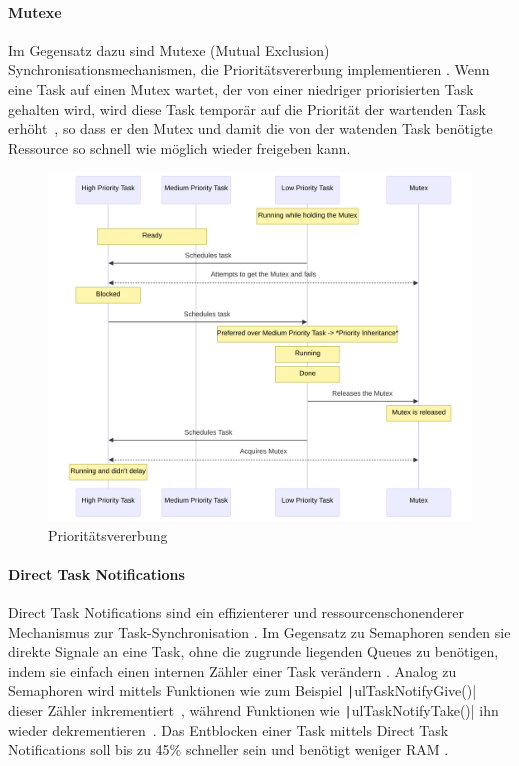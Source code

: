 \paragraph{Mutexe} \label{sec:mutex}

Im Gegensatz dazu sind Mutexe (Mutual Exclusion) Synchronisationsmechanismen,
die Prioritätsvererbung implementieren \cite{freertos_mutexes}. Wenn eine Task
auf einen Mutex wartet, der von einer niedriger priorisierten Task gehalten
wird, wird diese Task temporär auf die Priorität der wartenden Task
erhöht~\cite{FreertosForumSemphMtx}, so dass er den Mutex und damit die von der
watenden Task benötigte Ressource so schnell wie möglich wieder freigeben kann.

\begin{figure}[htb]
    \centering
    \includegraphics[width=1\textwidth]{assets/prio_inheritance}
    \caption{Prioritätsvererbung}
\end{figure}

\paragraph{Direct Task Notifications} \label{sec:direct_task_notification}

Direct Task Notifications sind ein effizienterer und ressourcenschonenderer
Mechanismus zur Task-Synchronisation \cite{freertos_task_notifications_desc}. Im
Gegensatz zu Semaphoren senden sie direkte Signale an eine Task, ohne die
zugrunde liegenden Queues zu benötigen, indem sie einfach einen internen Zähler
einer Task verändern \cite{freertos_tasks_c_308}. Analog zu Semaphoren wird
mittels Funktionen wie zum Beispiel \texttt|ulTaskNotifyGive()| dieser
Zähler inkrementiert~\cite{freertos_tasks_c_4990}, während Funktionen wie
\texttt|ulTaskNotifyTake()| ihn wieder
dekrementieren~\cite{freertos_tasks_c_4614}. Das Entblocken einer Task mittels
Direct Task Notifications soll bis zu 45\% schneller sein und benötigt weniger
RAM \cite{freertos_task_notifications_usage}.

